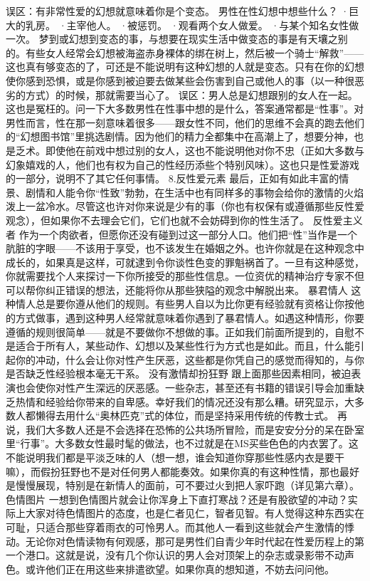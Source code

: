 \documentclass[12pt,UTF8]{ctexbook}
\begin{document}
误区：有非常性爱的幻想就意味着你是个变态。
男性在性幻想中想些什么？
·巨大的乳房。
·主宰他人。
·被惩罚。
·观看两个女人做爱。
·与某个知名女性做一次。
梦到或幻想到变态的事，与想要在现实生活中做变态的事是有天壤之别的。有些女人经常会幻想被海盗赤身裸体的绑在树上，然后被一个骑士“解救”——这也真有够变态的了，可还是不能说明有这种幻想的人就是变态。只有在你的幻想使你感到恐惧，或是你感到被迫要去做某些会伤害到自己或他人的事（以一种很恶劣的方式）的时候，那就需要当心了。
误区：男人总是幻想跟别的女人在一起。
这也是冤枉的。问一下大多数男性在性事中想的是什么，答案通常都是“性事”。对男性而言，性在那一刻意味着很多——跟女性不同，他们的思维不会真的跑去他们的“幻想图书馆”里挑选剧情。因为他们的精力全都集中在高潮上了，想要分神，也是乏术。即使他在前戏中想过别的女人，这也不能说明他对你不忠（正如大多数与幻象嬉戏的人，他们也有权为自己的性经历添些个特别风味）。这也只是性爱游戏的一部分，说明不了其它任何事情。
8.反性爱元素
最后，正如有如此丰富的情景、剧情和人能令你“性致”勃勃，在生活中也有同样多的事物会给你的激情的火焰泼上一盆冷水。尽管这也许对你来说是少有的事（你也有权保有或遵循那些反性爱观念），但如果你不去理会它们，它们也就不会妨碍到你的性生活了。
反性爱主义者
作为一个肉欲者，但愿你还没有碰到过这一部分人口。他们把“性”当作是一个肮脏的字眼——不该用于享受，也不该发生在婚姻之外。也许你就是在这种观念中成长的，如果真是这样，可就逮到令你谈性色变的罪魁祸首了。一旦有这种感觉，你就需要找个人来探讨一下你所接受的那些性信息。一位资优的精神治疗专家不但可以帮你纠正错误的想法，还能将你从那些狭隘的观念中解脱出来。
暴君情人
这种情人总是要你遵从他们的规则。有些男人自以为比你更有经验就有资格让你按他的方式做事，遇到这种男人经常就意味着你遇到了暴君情人。如遇这种情形，你要遵循的规则很简单——就是不要做你不想做的事。正如我们前面所提到的，自慰不是适合于所有人，某些动作、幻想以及某些性行为方式也是如此。而且，什么能引起你的冲动，什么会让你对性产生厌恶，这些都是你凭自己的感觉而得知的，与你是否缺乏性经验根本毫无干系。
没有激情却扮狂野
跟上面那些因素相同，被迫表演也会使你对性产生深远的厌恶感。一些杂志，甚至还有书籍的错误引导会加重缺乏热情和经验给你带来的自卑感。幸好我们的情况还没有那么糟。研究显示，大多数人都懒得去用什么“奥林匹克”式的体位，而是坚持采用传统的传教士式。
再说，我们大多数人还是不会选择在恐怖的公共场所冒险，而是安安分分的呆在卧室里“行事”。大多数女性最时髦的做法，也不过就是在MS买些色色的内衣罢了。这不能说明我们都是平淡乏味的人（想一想，谁会知道你穿那些性感内衣是要干嘛），而假扮狂野也不是对任何男人都能奏效。如果你真的有这种性情，那也最好是慢慢展现，特别是在新情人的面前，可不要过火到把人家吓跑（详见第六章）。
色情图片
一想到色情图片就会让你浑身上下直打寒战？还是有股欲望的冲动？实际上大家对待色情图片的态度，也是仁者见仁，智者见智。有人觉得这种东西实在可耻，只适合那些穿着雨衣的可怜男人。而其他人一看到这些就会产生激情的悸动。无论你对色情读物有何观感，那可是男性们自青少年时代起在性爱历程上的第一个港口。这就是说，没有几个你认识的男人会对顶架上的杂志或录影带不动声色。或许他们正在用这些来排遣欲望。如果你真的想知道，不妨去问问他。
\end{document}
